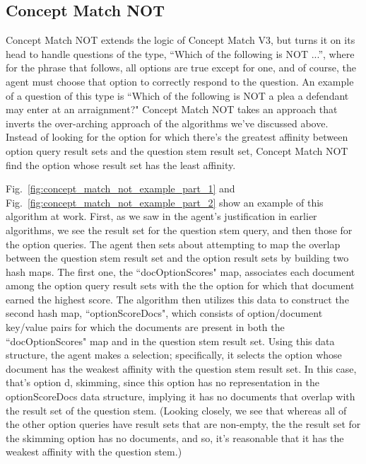 \subsection{Concept Match NOT}

Concept Match NOT extends the logic of Concept Match V3, but turns it on its head to handle questions of the type, ``Which of the following is NOT ...'', where for the phrase that follows, all options are true except for one, and of course, the agent must choose that option to correctly respond to the question.  An example of a question of this type is ``Which of the following is NOT a plea a defendant may enter at an arraignment?"
Concept Match NOT takes an approach that inverts the over-arching approach of the algorithms we've discussed above.  Instead of looking for the option for which there's the greatest affinity between option query result sets and the question stem result set, Concept Match NOT find the option whose result set has the least affinity.  

Fig.~\ref{fig:concept_match_not_example_part_1} and Fig.~\ref{fig:concept_match_not_example_part_2} show an example of this algorithm at work.  First, as we saw in the agent's justification in earlier algorithms, we see the result set for the question stem query, and then those for the option queries.  The agent then sets about attempting to map the overlap between the question stem result set and the option result sets by building two hash maps.  The first one, the ``docOptionScores" map, associates each document among the option query result sets with the the option for which that document earned the highest score.  The algorithm then utilizes this data to construct the second hash map, ``optionScoreDocs", which consists of option/document key/value pairs for which the documents are present in both the ``docOptionScores" map and in the question stem result set.  Using this data structure, the agent makes a selection; specifically, it selects the option whose document has the weakest affinity with the question stem result set.  In this case, that's option d, skimming, since this option has no representation in the optionScoreDocs data structure, implying it has no documents that overlap with the result set of the question stem.  (Looking closely, we see that whereas all of the other option queries have result sets that are non-empty, the the result set for the skimming option has no documents, and so, it's reasonable that it has the weakest affinity with the question stem.) 



